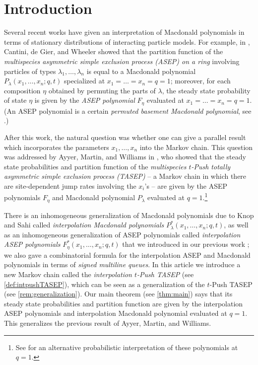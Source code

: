 \documentclass[12pt]{amsart}
\theoremstyle{definition}
\begin{document}
\section{Introduction}




Several recent works have given an interpretation of Macdonald polynomials in terms of stationary distributions of interacting particle models.
For example, in \cite{CantinideGierWheeler2015}, Cantini, de Gier, and Wheeler showed that the partition function of the \emph{multispecies asymmetric simple exclusion process (ASEP) on a ring} involving particles of types $\lambda_1,\dots,\lambda_n$ is equal to a Macdonald polynomial 
$P_{\lambda}(x_1,\dots,x_n;q,t)$ specialized at 
$x_1=\dots=x_n=q=1$; moreover, for each composition $\eta$ obtained by permuting the parts of $\lambda$, the  steady state probability of state $\eta$ is given by  the \emph{ASEP polynomial} $F_{\eta}$ evaluated at 
$x_1=\dots=x_n=q=1$.  (An ASEP polynomial is a certain \emph{permuted basement Macdonald polynomial}, see \cite[Proposition 4.1]{CorteelMandelshtamWilliams2022}.)

After this work, the natural question was whether one can give a parallel result which incorporates the parameters $x_1,\dots,x_n$ into the Markov chain.  This question was addressed by Ayyer, Martin, and Williams 
in   \cite{AyyerMartinWilliams2025}, who showed that the steady state probabilities and partition function of the  \emph{multispecies $t$-Push totally asymmetric simple exclusion process (TASEP)} -- a Markov chain in which there are site-dependent jump rates involving the $x_i$'s -- are given by the ASEP polynomials $F_{\eta}$ and Macdonald polynomial $P_{\lambda}$ evaluated at $q=1$.\footnote{See \cite{Defant2024} for an alternative probabilistic interpretation of these polynomials at $q=1$.}

There is an inhomogeneous generalization of Macdonald polynomials due to Knop and Sahi \cite{Knop1997b, Sahi1996} called \emph{interpolation Macdonald polynomials} $P^*_{\lambda}(x_1,\dots,x_n;q,t)$, as well as an inhomogeneous generalization of ASEP polynomials called \emph{interpolation ASEP polynomials} $F^*_{\eta}(x_1,\dots,x_n;q,t)$ that we introduced in our previous work \cite{BenDaliWilliams2025}; we also gave a combinatorial formula for the interpolation ASEP and Macdonald polynomials in terms of \emph{signed multiline queues}.  
In this article 
we introduce a new Markov chain called the \emph{interpolation $t$-Push TASEP}
(see \cref{def:intpushTASEP}), which can be seen as a generalization of the $t$-Push TASEP (see \cref{rem:generalization}).  Our main theorem (see \cref{thm:main}) says that its steady state probabilities and partition function are given by the interpolation ASEP polynomials and interpolation Macdonald polynomial evaluated at $q=1$.  This generalizes the previous result of Ayyer, Martin, and Williams.
\end{document}
